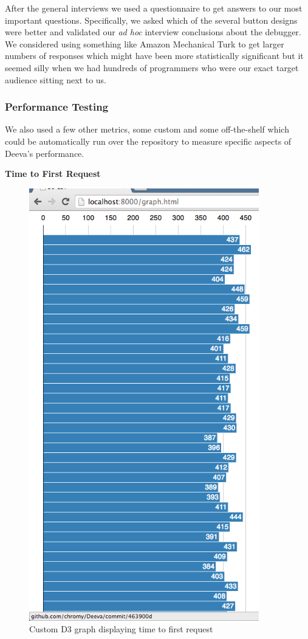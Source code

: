 \documentclass[11pt, a4paper]{article}
\begin{document}
After the general interviews we used a questionnaire to get answers to our most important questions.
Specifically, we asked which of the several button designs were better and validated our \emph{ad hoc} interview conclusions about the debugger.
We considered using something like Amazon Mechanical Turk to get larger numbers of responses which might have been more statistically significant but it seemed silly when we had hundreds of programmers who were our exact target audience sitting next to us.


\subsubsection{Performance Testing}
We also used a few other metrics, some custom and some off-the-shelf which could be automatically run over the repository to measure specific aspects of Deeva’s performance.

\textbf{Time to First Request}

\begin{figure}[h!]
\centering
\includegraphics[width=100mm]{timeToFirstRequest.png}
\caption{Custom D3 graph displaying time to first request}
\label{fig:timeToFirstRequest}
\end{figure}
\end{document}
